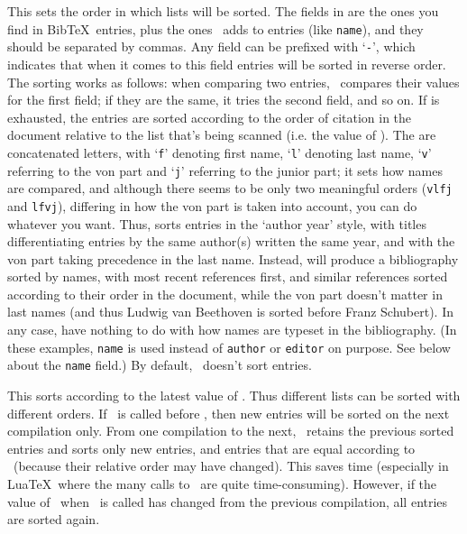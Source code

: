 This sets the order in which lists will be sorted. The fields in
 are the ones you find in Bib\TeX\ entries,
plus the ones \lib\ adds to entries (like \texttt{name}), and they should
be separated by commas. Any field can be prefixed with `\texttt{-}',
which indicates that when it comes to this field entries will be
sorted in reverse order. The sorting works as follows: when comparing
two entries, \lib\ compares their values for the first field; if they
are the same, it tries the second field, and so on. If 
is exhausted, the entries are sorted according to the order of citation
in the document relative to the list that's being scanned (i.e. the value
of \tcmd\EntryNumber). The 
are concatenated letters, with `\texttt{f}' denoting first name, `\texttt{l}'
denoting last name, `\texttt{v}' referring to the von part and `\texttt{j}'
referring to the junior part; it sets how names are compared, and although
there seems to be only two meaningful orders (\texttt{vlfj} and \texttt{lfvj}),
differing in how the von part is taken into account, you can do whatever you
want. Thus,  sorts entries in
the `author year' style, with titles differentiating entries by the same
author(s) written the same year, and with the von part taking precedence in
the last name. Instead,  
will produce a bibliography sorted by names, with most recent references first,
and similar references sorted according to their order in the document, while
the von part doesn't matter in last names (and thus Ludwig van Beethoven is
sorted before Franz Schubert). In any case,  have nothing
to do with how names are typeset in the bibliography. (In these examples,
\texttt{name} is used instead of \texttt{author} or \texttt{editor} on purpose.
See below about the \texttt{name} field.) By default, \lib\ doesn't sort entries.

This sorts  according to the latest value of \tcmd\SortingOrder.
Thus different lists can be sorted with different orders. If \tcmd\SortList\
is called before \tcmd\BibFile, then new entries will be sorted on the
next compilation only. From one compilation to the next, \lib\ retains
the previous sorted entries and sorts only new entries, and entries that
are equal according to \tcmd\SortingOrder\ (because their relative order
may have changed). This saves time (especially in Lua\TeX\ where the many
calls to \tcmd\directlua\ are quite time-consuming). However, if the value
of \tcmd\SortingOrder\ when \tcmd\SortList\ is called has changed from the
previous compilation, all entries are sorted again.


